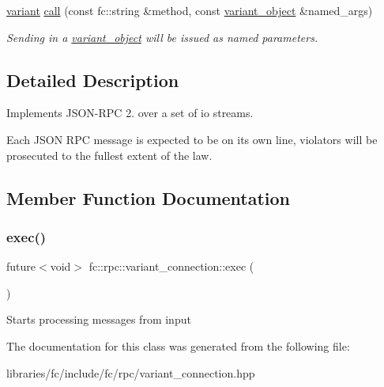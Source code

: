 \begin{Indent}
\begin{DoxyCompactItemize}
\item 
\mbox{\label{classfc_1_1rpc_1_1variant__connection_a551535350ba594af326806a447a6e735}} 
\mbox{\hyperlink{classfc_1_1variant}{variant}} \mbox{\hyperlink{classfc_1_1rpc_1_1variant__connection_a551535350ba594af326806a447a6e735}{call}} (const fc\+::string \&method, const \mbox{\hyperlink{classfc_1_1variant__object}{variant\+\_\+object}} \&named\+\_\+args)
\begin{DoxyCompactList}\small\item\em Sending in a \mbox{\hyperlink{classfc_1_1variant__object}{variant\+\_\+object}} will be issued as named parameters. \end{DoxyCompactList}\end{DoxyCompactItemize}
\end{Indent}


\subsection{Detailed Description}
Implements J\+S\+O\+N-\/\+R\+PC 2. over a set of io streams. 

Each J\+S\+ON R\+PC message is expected to be on its own line, violators will be prosecuted to the fullest extent of the law. 

\subsection{Member Function Documentation}
\mbox{\label{classfc_1_1rpc_1_1variant__connection_ac5707f1d0255a96589c879c3590a7209}} 
\subsubsection{\texorpdfstring{exec()}{exec()}}
{\footnotesize\ttfamily future$<$void$>$ fc\+::rpc\+::variant\+\_\+connection\+::exec (\begin{DoxyParamCaption}{ }\end{DoxyParamCaption})}

Starts processing messages from input 

The documentation for this class was generated from the following file\+:\begin{DoxyCompactItemize}
\item 
libraries/fc/include/fc/rpc/variant\+\_\+connection.\+hpp\end{DoxyCompactItemize}
